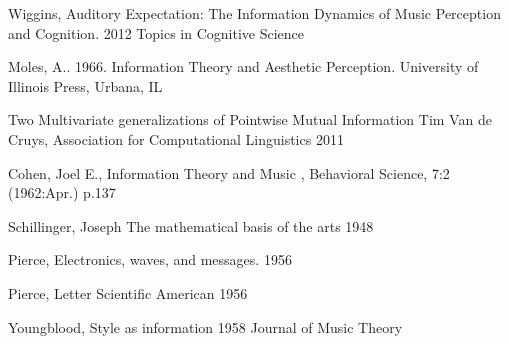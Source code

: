 \documentclass[final,authoryear,5p,times,twocolumn]{elsarticle}
\begin{document}
Wiggins, Auditory Expectation: The Information Dynamics of Music Perception and Cognition. 2012 Topics in Cognitive Science

Moles, A.. 1966. Information Theory and Aesthetic Perception. University of Illinois Press, Urbana, IL

Two Multivariate generalizations of Pointwise Mutual Information Tim Van de Cruys, Association for Computational Linguistics 2011

Cohen, Joel E., Information Theory and Music , Behavioral Science, 7:2 (1962:Apr.) p.137

Schillinger, Joseph The mathematical basis of the arts 1948

Pierce, Electronics, waves, and messages. 1956

Pierce, Letter Scientific American 1956

Youngblood, Style as information 1958 Journal of Music Theory



%
%             



\end{document}
